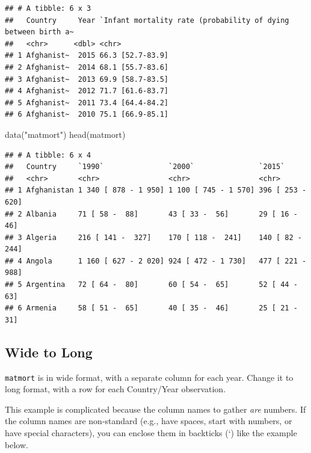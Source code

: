 \documentclass[
  oneside]{book}
\newenvironment{Shaded}{\begin{snugshade}}{\end{snugshade}}
\newcommand{\FunctionTok}[1]{\textcolor[rgb]{0.00,0.00,0.00}{#1}}
\newcommand{\NormalTok}[1]{#1}
\newcommand{\StringTok}[1]{\textcolor[rgb]{0.31,0.60,0.02}{#1}}
\begin{document}
\begin{verbatim}
## # A tibble: 6 x 3
##   Country     Year `Infant mortality rate (probability of dying between birth a~
##   <chr>      <dbl> <chr>                                                        
## 1 Afghanist~  2015 66.3 [52.7-83.9]                                             
## 2 Afghanist~  2014 68.1 [55.7-83.6]                                             
## 3 Afghanist~  2013 69.9 [58.7-83.5]                                             
## 4 Afghanist~  2012 71.7 [61.6-83.7]                                             
## 5 Afghanist~  2011 73.4 [64.4-84.2]                                             
## 6 Afghanist~  2010 75.1 [66.9-85.1]
\end{verbatim}

\begin{Shaded}
\begin{Highlighting}[]
\FunctionTok{data}\NormalTok{(}\StringTok{"matmort"}\NormalTok{)}
\FunctionTok{head}\NormalTok{(matmort)}
\end{Highlighting}
\end{Shaded}

\begin{verbatim}
## # A tibble: 6 x 4
##   Country     `1990`               `2000`               `2015`           
##   <chr>       <chr>                <chr>                <chr>            
## 1 Afghanistan 1 340 [ 878 - 1 950] 1 100 [ 745 - 1 570] 396 [ 253 -  620]
## 2 Albania     71 [ 58 -  88]       43 [ 33 -  56]       29 [ 16 -  46]   
## 3 Algeria     216 [ 141 -  327]    170 [ 118 -  241]    140 [ 82 -  244] 
## 4 Angola      1 160 [ 627 - 2 020] 924 [ 472 - 1 730]   477 [ 221 -  988]
## 5 Argentina   72 [ 64 -  80]       60 [ 54 -  65]       52 [ 44 -  63]   
## 6 Armenia     58 [ 51 -  65]       40 [ 35 -  46]       25 [ 21 -  31]
\end{verbatim}

\hypertarget{wide-to-long}{%
\subsection{Wide to Long}\label{wide-to-long}}

\texttt{matmort} is in wide format, with a separate column for each year. Change it to long format, with a row for each Country/Year observation.

This example is complicated because the column names to gather \emph{are} numbers. If the column names are non-standard (e.g., have spaces, start with numbers, or have special characters), you can enclose them in backticks (`) like the example below.
\end{document}
